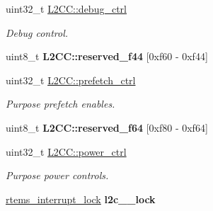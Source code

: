 \begin{DoxyCompactItemize}
uint32\+\_\+t \mbox{\hyperlink{group__L2C-310__cache_gafb06e31ba83abe243926605bb13ddff0}{L2\+C\+C\+::debug\+\_\+ctrl}}
\begin{DoxyCompactList}\small\item\em Debug control. \end{DoxyCompactList}\item 
\mbox{\label{group__L2C-310__cache_gaf56d5e6b3710d43d1915731548f734c5}} 
uint8\+\_\+t {\bfseries L2\+C\+C\+::reserved\+\_\+f44} \mbox{[}0xf60 -\/ 0xf44\mbox{]}
\item 
\mbox{\label{group__L2C-310__cache_ga518e788c108e0d0c89e82fb2e1a13fe9}} 
uint32\+\_\+t \mbox{\hyperlink{group__L2C-310__cache_ga518e788c108e0d0c89e82fb2e1a13fe9}{L2\+C\+C\+::prefetch\+\_\+ctrl}}
\begin{DoxyCompactList}\small\item\em Purpose prefetch enables. \end{DoxyCompactList}\item 
\mbox{\label{group__L2C-310__cache_gab65edecccd4cd8623ada0b678cc04a37}} 
uint8\+\_\+t {\bfseries L2\+C\+C\+::reserved\+\_\+f64} \mbox{[}0xf80 -\/ 0xf64\mbox{]}
\item 
\mbox{\label{group__L2C-310__cache_ga2ae509b4cf229f50e710c494296d6c26}} 
uint32\+\_\+t \mbox{\hyperlink{group__L2C-310__cache_ga2ae509b4cf229f50e710c494296d6c26}{L2\+C\+C\+::power\+\_\+ctrl}}
\begin{DoxyCompactList}\small\item\em Purpose power controls. \end{DoxyCompactList}\item 
\mbox{\hyperlink{group__ClassicINTRLocks_ga7d4b54b01fd1507aa842d5fbc7b11177}{rtems\+\_\+interrupt\+\_\+lock}} {\bfseries l2c\+\_\+\_\+lock}
\end{DoxyCompactItemize}
